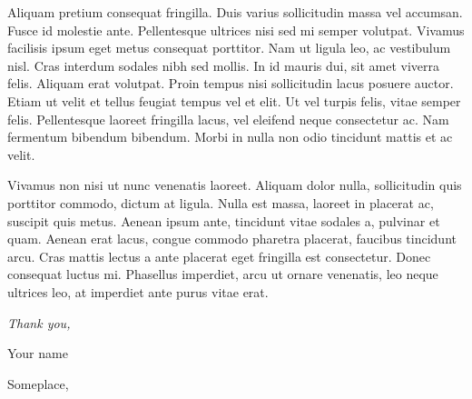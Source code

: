 

\begin{acknowledgements}      

Aliquam pretium consequat fringilla. Duis varius sollicitudin massa vel
accumsan. Fusce id molestie ante. Pellentesque ultrices nisi sed mi semper
volutpat. Vivamus facilisis ipsum eget metus consequat porttitor. Nam ut ligula
leo, ac vestibulum nisl. Cras interdum sodales nibh sed mollis. In id mauris
dui, sit amet viverra felis. Aliquam erat volutpat. Proin tempus nisi
sollicitudin lacus posuere auctor. Etiam ut velit et tellus feugiat tempus vel
et elit. Ut vel turpis felis, vitae semper felis. Pellentesque laoreet fringilla
lacus, vel eleifend neque consectetur ac. Nam fermentum bibendum bibendum. Morbi
in nulla non odio tincidunt mattis et ac velit.

Vivamus non nisi ut nunc venenatis laoreet. Aliquam dolor nulla, sollicitudin
quis porttitor commodo, dictum at ligula. Nulla est massa, laoreet in placerat
ac, suscipit quis metus. Aenean ipsum ante, tincidunt vitae sodales a, pulvinar
et quam. Aenean erat lacus, congue commodo pharetra placerat, faucibus tincidunt
arcu. Cras mattis lectus a ante placerat eget fringilla est consectetur. Donec
consequat luctus mi. Phasellus imperdiet, arcu ut ornare venenatis, leo neque
ultrices leo, at imperdiet ante purus vitae erat.

\begin{flushright}
\textit{Thank you,}

Your name

Someplace, \monthname{} \the\year



\end{flushright}

\end{acknowledgements}



